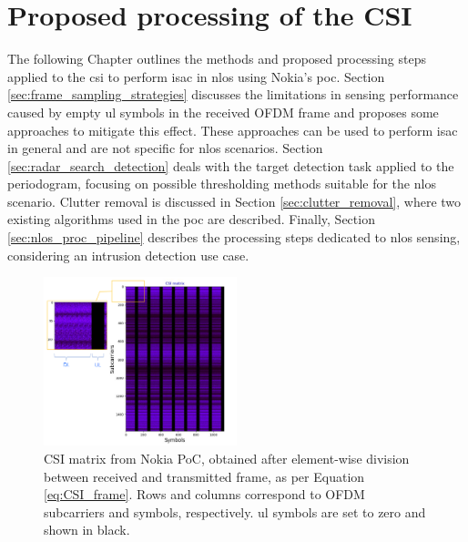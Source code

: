 \chapter{Proposed processing of the CSI}
\label{chap:TDD pattern of the OFDM frame}

The following Chapter outlines the methods and proposed processing steps applied to the \gls{csi} to perform \gls{isac} in \gls{nlos} using Nokia's \gls{poc}.
Section \ref{sec:frame_sampling_strategies} discusses the limitations in sensing performance caused by empty \gls{ul} symbols in the received OFDM frame and proposes some approaches to mitigate this effect.
These approaches can be used to perform \gls{isac} in general and are not specific for \gls{nlos} scenarios.
Section \ref{sec:radar_search_detection} deals with the target detection task applied to the periodogram, focusing on possible thresholding methods suitable for the \gls{nlos} scenario.
Clutter removal is discussed in Section \ref{sec:clutter_removal}, where two existing algorithms used in the \gls{poc} are described.
Finally, Section \ref{sec:nlos_proc_pipeline} describes the processing steps dedicated to \gls{nlos} sensing, considering an intrusion detection use case.
\begin{figure}[H]
	\centering
	\includegraphics[width=0.5\textwidth]{Images/TDDprocessing/CSIMatrix_DLULpattern.png}
	\caption{\small CSI matrix from Nokia PoC, obtained after element-wise division between received and transmitted frame, as per Equation \eqref{eq:CSI_frame}.
		Rows and columns correspond to OFDM subcarriers and symbols, respectively. \Gls{ul} symbols are set to zero and shown in black.}
	\label{fig:CSIMatrix_DLULpattern}
\end{figure}

